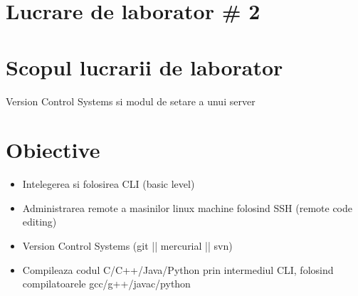 \section*{Lucrare de laborator \# 2}

\section{Scopul lucrarii de laborator}
Version Control Systems si modul de setare a unui server
\section{Obiective}
\begin{itemize}
\item Intelegerea si folosirea CLI (basic level)
\item Administrarea remote a masinilor linux machine folosind SSH (remote code editing)
\item Version Control Systems (git || mercurial || svn)
\item Compileaza codul C/C++/Java/Python prin intermediul CLI, folosind compilatoarele gcc/g++/javac/python
\end{itemize}



\clearpage